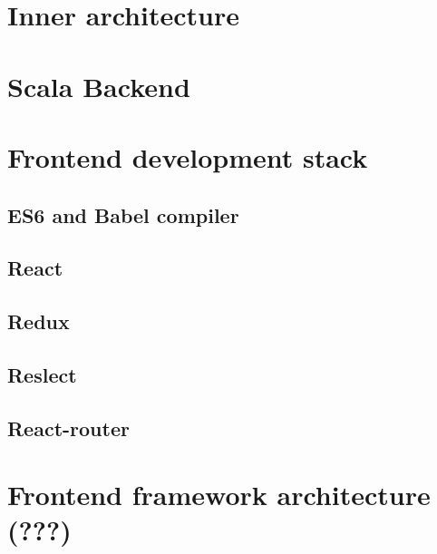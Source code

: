 \section{Inner architecture}






\section{Scala Backend}






\section{Frontend development stack}

\subsection{ES6 and Babel compiler}

\subsection{React}

\subsection{Redux}

\subsection{Reslect}

\subsection{React-router}



\section{Frontend framework architecture (???)}

